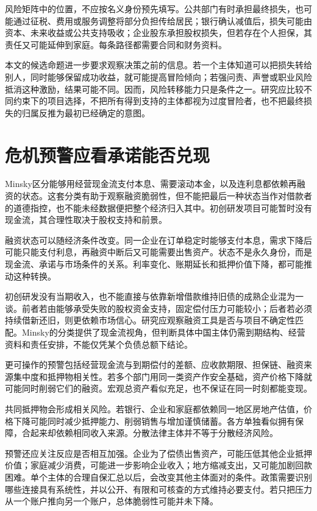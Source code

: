 \documentclass[UTF8,fontset=fandol,zihao=-4,oneside,openany]{ctexbook}
\begin{document}
\label{arg:P112}
风险矩阵中的位置，不应按名义身份预先填写。公共部门有时承担最终损失，也可能通过征税、费用或服务调整将部分负担传给居民；银行确认减值后，损失可能由资本、未来收益或公共支持吸收；企业股东承担股权损失，但若存在个人担保，其责任又可能延伸到家庭。每条路径都需要合同和财务资料。

本文的候选命题进一步要求观察决策之前的信息。若一个主体知道可以把损失转给别人，同时能够保留成功收益，就可能提高冒险倾向；若强问责、声誉或职业风险抵消这种激励，结果可能不同。因而，风险转移能力只是条件之一。研究应比较不同约束下的项目选择，不把所有得到支持的主体都视为过度冒险者，也不把最终损失的归属反推为最初已经确定的意图。

\section{危机预警应看承诺能否兑现}
Minsky区分能够用经营现金流支付本息、需要滚动本金，以及连利息都依赖再融资的状态。这套分类有助于观察融资脆弱性，但不能把最后一种状态当作对借款者的道德指控，也不能未经数据便把整个经济归入其中。初创研发项目可能暂时没有现金流，其合理性取决于股权支持和前景。\cite{Minsky1992}

\label{arg:P113}
融资状态可以随经济条件改变。同一企业在订单稳定时能够支付本息，需求下降后可能只能支付利息，再融资中断后又可能需要出售资产。状态不是永久身份，而是现金流、承诺与市场条件的关系。利率变化、账期延长和抵押价值下降，都可能推动这种转换。

初创研发没有当期收入，也不能直接与依靠新增借款维持旧债的成熟企业混为一谈。前者若由能够承受失败的股权资金支持，固定偿付压力可能较小；后者若必须持续借新还旧，则更依赖市场信心。研究应观察融资工具是否与项目不确定性匹配。Minsky的分类提供了现金流视角，但判断具体中国主体仍需到期结构、经营资料和责任安排，不能仅凭某个负债总额下结论。

更可操作的预警包括经营现金流与到期偿付的差额、应收款期限、担保链、融资来源集中度和抵押物相关性。若多个部门用同一类资产作安全基础，资产价格下降就可能同时削弱它们的融资。宏观总资产看似充足，也不保证在同一时刻都能变现。

\label{arg:P114}
共同抵押物会形成相关风险。若银行、企业和家庭都依赖同一地区房地产估值，价格下降可能同时减少抵押能力、削弱销售与增加谨慎储蓄。各方单独看似拥有保障，合起来却依赖相同收入来源。分散法律主体并不等于分散经济风险。

预警还应关注反应是否相互加强。企业为了偿债出售资产，可能压低其他企业抵押价值；家庭减少消费，可能进一步影响企业收入；地方缩减支出，又可能加剧回款困难。单个主体的合理自保汇总以后，会改变其他主体面对的条件。政策需要识别哪些连接具有系统性，并以公开、有限和可核查的方式维持必要支付。若只把压力从一个账户推向另一个账户，总体脆弱性可能并未下降。
\end{document}
